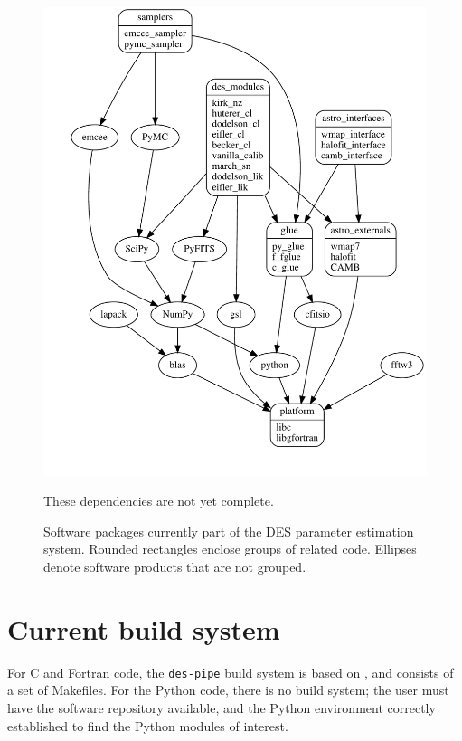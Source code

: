\documentclass[draftmode,draftwater]{memarticle}
\begin{document}
\begin{figure}
{  \includegraphics[width=\textwidth]{astro_packages}
}
\begin{fixme}
  These dependencies are not yet complete.
\end{fixme}
  \caption{Software packages currently part of the DES parameter
  estimation system. Rounded rectangles enclose groups of related
  code. Ellipses denote software products that are not grouped.}
  \label{fig:astropackages}
\end{figure}


\section{Current build system}

For C and Fortran code, the \texttt{des-pipe} build system is based on
, and consists of a set of Makefiles. For the Python code,
there is no build system; the user must have the software repository
available, and the Python environment correctly established to find the
Python modules of interest.
\end{document}
